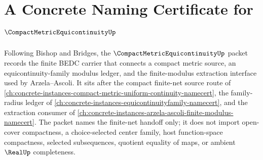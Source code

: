\chapter{A Concrete Naming Certificate for $\CompactMetricEquicontinuityUp$}
\label{ch:concrete-instances-compact-metric-equicontinuity-namecert}

Following Bishop and Bridges, the $\CompactMetricEquicontinuityUp$ packet records the finite BEDC carrier that connects a compact metric source, an equicontinuity-family modulus ledger, and the finite-modulus extraction interface used by Arzela--Ascoli. It sits after the compact finite-net source route of \autoref{ch:concrete-instances-compact-metric-uniform-continuity-namecert}, the family-radius ledger of \autoref{ch:concrete-instances-equicontinuityfamily-namecert}, and the extraction consumer of \autoref{ch:concrete-instances-arzela-ascoli-finite-modulus-namecert}. The packet names the finite-net handoff only; it does not import open-cover compactness, a choice-selected center family, host function-space compactness, selected subsequences, quotient equality of maps, or ambient $\RealUp$ completeness.

